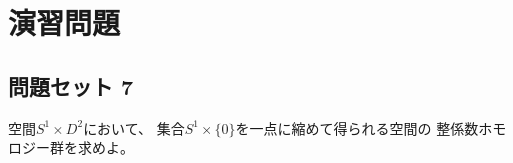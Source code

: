 \documentclass[report]{jlreq}
\begin{document}
\TODO{}

%
\newpage
\section{演習問題}

\subsection{問題セット 7}

\begin{problem}
    空間$S^1 \times D^2$において、
    集合$S^1 \times \{ 0 \}$を一点に縮めて得られる空間の
    整係数ホモロジー群を求めよ。
\end{problem}
\end{document}
